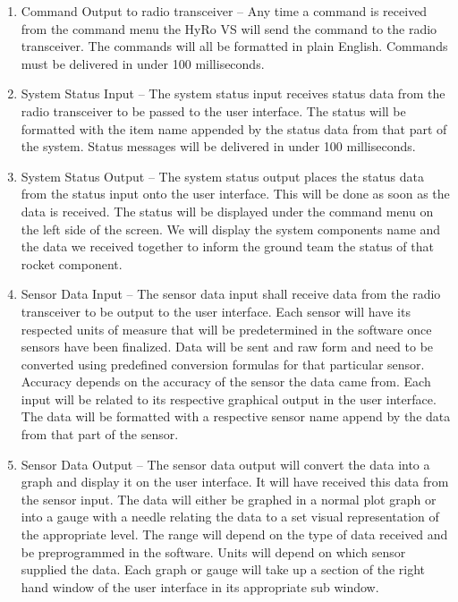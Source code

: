 \documentclass[10pt,draftclsnofoot,onecolumn]{IEEEtran}
\begin{document}
\begin{enumerate}
\item Command Output to radio transceiver –
	Any time a command is received from the command menu the HyRo VS will send the command to the radio transceiver. The commands will all be formatted in plain English. Commands must be delivered in under 100 milliseconds.
\item System Status Input –
	The system status input receives status data from the radio transceiver to be passed to the user interface. The status will be formatted with the item name appended by the status data from that part of the system. Status messages will be delivered in under 100 milliseconds. 
\item System Status Output –
The system status output places the status data from the status input onto the user interface. This will be done as soon as the data is received. The status will be displayed under the command menu on the left side of the screen. We will display the system components name and the data we received together to inform the ground team the status of that rocket component.
\item Sensor Data Input –
The sensor data input shall receive data from the radio transceiver to be output to the user interface. Each sensor will have its respected units of measure that will be predetermined in the software once sensors have been finalized. Data will be sent and raw form and need to be converted using predefined conversion formulas for that particular sensor. Accuracy depends on the accuracy of the sensor the data came from. Each input will be related to its respective graphical output in the user interface. The data will be formatted with a respective sensor name append by the data from that part of the sensor.
\item Sensor Data Output –
The sensor data output will convert the data into a graph and display it on the user interface. It will have received this data from the sensor input. The data will either be graphed in a normal plot graph or into a gauge with a needle relating the data to a set visual representation of the appropriate level. The range will depend on the type of data received and be preprogrammed in the software. Units will depend on which sensor supplied the data. Each graph or gauge will take up a section of the right hand window of the user interface in its appropriate sub window. 
\end{enumerate}
\end{document}
